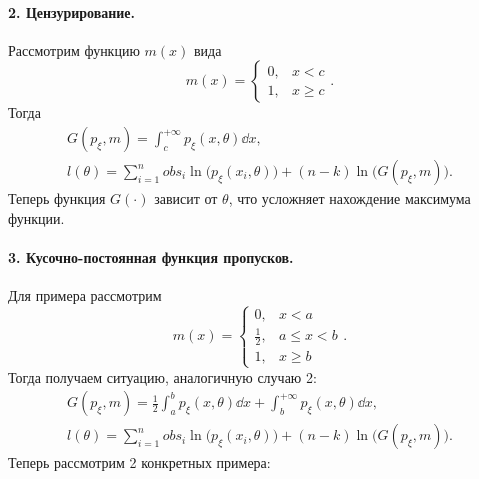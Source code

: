     \paragraph{2. Цензурирование.} Рассмотрим функцию $m(x)$ вида
    \begin{equation*}
        m(x) = \begin{cases}
            0, & x < c \\
            1, & x \ge c
        \end{cases}.
    \end{equation*}
    Тогда
    \begin{gather*}
        G(p_\xi, m) = \int_{c}^{+\infty}p_\xi(x, \theta)\dd x, \\
        l(\theta) = \sum_{i=1}^{n}obs_i\ln\big(p_\xi(x_i,\theta)\big) + (n-k)\ln\big(G(p_\xi, m)\big).
    \end{gather*}
    Теперь функция $G(\cdot)$ зависит от $\theta$, что усложняет нахождение максимума функции.

    \paragraph{3. Кусочно-постоянная функция пропусков.} Для примера рассмотрим
    \begin{equation*}
        m(x) = \begin{cases}
            0, & x < a \\
            \frac12, & a \le x < b \\
            1, & x \ge b
        \end{cases}.
    \end{equation*}
    Тогда получаем ситуацию, аналогичную случаю 2:
    \begin{gather*}
        G(p_\xi, m) = \frac12\int_{a}^{b}p_\xi(x, \theta)\dd x + \int_{b}^{+\infty}p_\xi(x, \theta)\dd x, \\
        l(\theta) = \sum_{i=1}^{n}obs_i\ln\big(p_\xi(x_i,\theta)\big) + (n-k)\ln\big(G(p_\xi, m)\big).
    \end{gather*}
    Теперь рассмотрим 2 конкретных примера:

